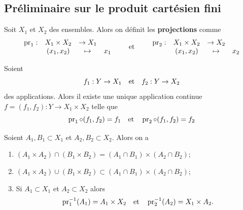 \subsection{Préliminaire sur le produit cartésien fini}
\begin{definition}
	Soit $X_1$ et $X_2$ des ensembles. Alors on définit les \textbf{projections} comme
	\[
	\begin{array}{cccc}
		\operatorname{pr}_1 : & X_1 \times X_2 & \to X_1 \\
		        & (x_1, x_2) & \mapsto & x_1 
	\end{array}
	\quad 
	\quad \text{et} \quad 
	\quad 
	\begin{array}{cccc}
		\operatorname{pr}_2 : & X_1 \times X_2 & \to X_2 \\
		& (x_1, x_2) & \mapsto & x_2 
	\end{array}
	\]
\end{definition}

\begin{proposition}
	Soient 
	\[
	f_1 : Y \to X_1 \quad \text{et} \quad f_2 : Y \to X_2
	\]
	des applications. Alors il existe une unique application continue $f = (f_1, f_2) : Y \to X_1 \times X_2$ telle que
	\[
	\operatorname{pr}_1 \circ (f_1, f_2) = f_1 \quad \text{et} \quad \operatorname{pr}_2 \circ (f_1, f_2) = f_2
	\]
\end{proposition}
\begin{figure}[H]
	\centering
\end{figure}

\begin{proposition}
	Soient $A_1, B_1 \subset X_1$ et $A_2, B_2 \subset X_2$. Alors on a 
	\begin{enumerate}
		\item $(A_1 \times A_2) \cap (B_1 \times B_2) = (A_1 \cap B_1) \times (A_2 \cap B_2)$;
		
		\item $(A_1 \times A_2) \cup (B_1 \times B_2) \subset (A_1 \cap B_1) \times (A_2 \cap B_2)$;
		
		\item Si $A_1 \subset X_1$ et $A_2 \subset X_2$ alors
		\[
		\operatorname{pr}_1^{-1} (A_1) = A_1 \times X_2 \quad \text{et} \quad \operatorname{pr}_2^{-1} (A_2) = X_1 \times A_2.
		\]
	\end{enumerate}
\end{proposition}


